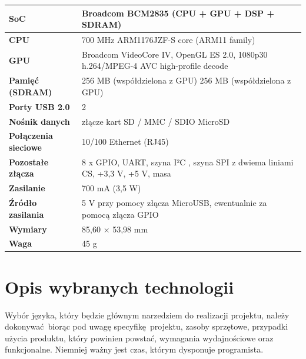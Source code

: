 \documentclass[eng,printmode]{mgr}
\begin{document}
\setlength{\tabcolsep}{10pt} %
\renewcommand{\arraystretch}{1.5} %
\vspace{0.5cm}
\begin{tabular}{| m{} | m{} |}
  \hline             
  \textbf{SoC} & Broadcom BCM2835 (CPU + GPU + DSP + SDRAM) \\ \hline
  \textbf{CPU} & 700 MHz ARM1176JZF-S core (ARM11 family) \\ \hline
  \textbf{GPU} & Broadcom VideoCore IV, OpenGL ES 2.0, 1080p30 h.264/MPEG-4 AVC high-profile decode \\ \hline
  \textbf{Pamięć (SDRAM)} & 256 MB (współdzielona z GPU)  256 MB (współdzielona z GPU) \\ \hline
  \textbf{Porty USB 2.0} & 2 \\ \hline
  \textbf{Nośnik danych} & złącze kart SD / MMC / SDIO MicroSD \\ \hline
  \textbf{Połączenia sieciowe} & 10/100 Ethernet (RJ45) \\ \hline
  \textbf{Pozostałe złącza} & 8 x GPIO, UART, szyna I²C , szyna SPI z dwiema liniami CS, +3,3 V, +5 V, masa \\ \hline
  \textbf{Zasilanie} & 700 mA (3,5 W) \\ \hline
  \textbf{Źródło zasilania} & 5 V przy pomocy złącza MicroUSB, ewentualnie za pomocą złącza GPIO \\ \hline
  \textbf{Wymiary} & 85,60 × 53,98 mm \\ \hline
  \textbf{Waga} & 45 g \\
  \hline  
\end{tabular}









\chapter{Opis wybranych technologii}
\label{chap:technologies}

Wybór języka, który będzie głównym narzedziem do realizacji projektu, należy dokonywać biorąc pod uwagę specyfikę projektu, zasoby sprzętowe, przypadki użycia produktu, który powinien powstać, wymagania wydajnościowe oraz funkcjonalne. Niemniej ważny jest czas, którym dysponuje programista. 
\end{document}
